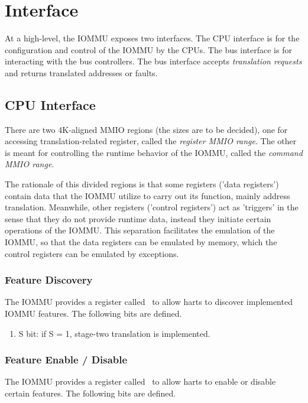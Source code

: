 \section{Interface}

At a high-level, the IOMMU exposes two interfaces. The CPU interface is for the
configuration and control of the IOMMU by the CPUs. The bus interface is for interacting
with the bus controllers. The bus interface accepts \textit{translation requests} and
returns translated addresses or faults.

\subsection{CPU Interface}

There are two 4K-aligned MMIO regions (the sizes are to be decided), one for accessing
translation-related register, called the \textit{register MMIO range}. The other is meant
for controlling the runtime behavior of the IOMMU, called the \textit{command MMIO range}.

The rationale of this divided regions is that some registers ('data registers') contain
data that the IOMMU utilize to carry out its function, mainly address translation.
Meanwhile, other registers ('control registers') act as 'triggers' in the sense that they
do not provide runtime data, instead they initiate certain operations of the IOMMU. This
separation facilitates the emulation of the IOMMU, so that the data registers can be
emulated by memory, which the control registers can be emulated by exceptions.

\subsubsection{Feature Discovery}

The IOMMU provides a register called \iommucap\ to allow harts to discover implemented
IOMMU features. The following bits are defined.

\begin{enumerate}
    \item S  bit: if S = 1, stage-two translation is implemented.
\end{enumerate}

\subsubsection{Feature Enable / Disable}

The IOMMU provides a register called \iommucapen\ to allow harts to enable or disable
certain features. The following bits are defined.

